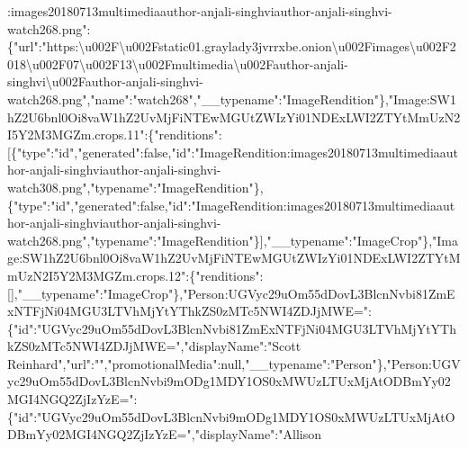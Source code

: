 :images20180713multimediaauthor-anjali-singhviauthor-anjali-singhvi-watch268.png":\{"url":"https:\textbackslash{}u002F\textbackslash{}u002Fstatic01.graylady3jvrrxbe.onion\textbackslash{}u002Fimages\textbackslash{}u002F2018\textbackslash{}u002F07\textbackslash{}u002F13\textbackslash{}u002Fmultimedia\textbackslash{}u002Fauthor-anjali-singhvi\textbackslash{}u002Fauthor-anjali-singhvi-watch268.png","name":"watch268","\_\_typename":"ImageRendition"\},"Image:SW1hZ2U6bnl0Oi8vaW1hZ2UvMjFiNTEwMGUtZWIzYi01NDExLWI2ZTYtMmUzN2I5Y2M3MGZm.crops.11":\{"renditions":{[}\{"type":"id","generated":false,"id":"ImageRendition:images20180713multimediaauthor-anjali-singhviauthor-anjali-singhvi-watch308.png","typename":"ImageRendition"\},\{"type":"id","generated":false,"id":"ImageRendition:images20180713multimediaauthor-anjali-singhviauthor-anjali-singhvi-watch268.png","typename":"ImageRendition"\}{]},"\_\_typename":"ImageCrop"\},"Image:SW1hZ2U6bnl0Oi8vaW1hZ2UvMjFiNTEwMGUtZWIzYi01NDExLWI2ZTYtMmUzN2I5Y2M3MGZm.crops.12":\{"renditions":{[}{]},"\_\_typename":"ImageCrop"\},"Person:UGVyc29uOm55dDovL3BlcnNvbi81ZmExNTFjNi04MGU3LTVhMjYtYThkZS0zMTc5NWI4ZDJjMWE=":\{"id":"UGVyc29uOm55dDovL3BlcnNvbi81ZmExNTFjNi04MGU3LTVhMjYtYThkZS0zMTc5NWI4ZDJjMWE=","displayName":"Scott
Reinhard","url":"","promotionalMedia":null,"\_\_typename":"Person"\},"Person:UGVyc29uOm55dDovL3BlcnNvbi9mODg1MDY1OS0xMWUzLTUxMjAtODBmYy02MGI4NGQ2ZjIzYzE=":\{"id":"UGVyc29uOm55dDovL3BlcnNvbi9mODg1MDY1OS0xMWUzLTUxMjAtODBmYy02MGI4NGQ2ZjIzYzE=","displayName":"Allison
